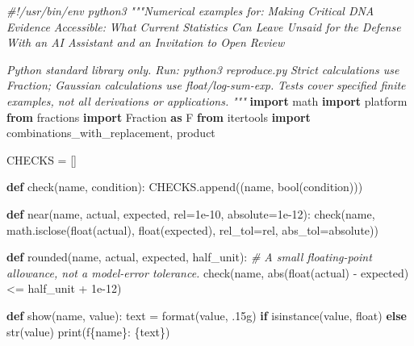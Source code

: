 \documentclass[
]{article}
\newenvironment{Shaded}{}{}
\newcommand{\BuiltInTok}[1]{\textcolor[rgb]{0.00,0.50,0.00}{#1}}
\newcommand{\CommentTok}[1]{\textcolor[rgb]{0.38,0.63,0.69}{\textit{#1}}}
\newcommand{\ControlFlowTok}[1]{\textcolor[rgb]{0.00,0.44,0.13}{\textbf{#1}}}
\newcommand{\FloatTok}[1]{\textcolor[rgb]{0.25,0.63,0.44}{#1}}
\newcommand{\ImportTok}[1]{\textcolor[rgb]{0.00,0.50,0.00}{\textbf{#1}}}
\newcommand{\KeywordTok}[1]{\textcolor[rgb]{0.00,0.44,0.13}{\textbf{#1}}}
\newcommand{\NormalTok}[1]{#1}
\newcommand{\OperatorTok}[1]{\textcolor[rgb]{0.40,0.40,0.40}{#1}}
\newcommand{\SpecialCharTok}[1]{\textcolor[rgb]{0.25,0.44,0.63}{#1}}
\newcommand{\SpecialStringTok}[1]{\textcolor[rgb]{0.73,0.40,0.53}{#1}}
\newcommand{\StringTok}[1]{\textcolor[rgb]{0.25,0.44,0.63}{#1}}
\begin{document}
\begin{Shaded}
\begin{Highlighting}[]
\CommentTok{\#!/usr/bin/env python3}
\CommentTok{"""Numerical examples for:}
\CommentTok{Making Critical DNA Evidence Accessible:}
\CommentTok{What Current Statistics Can Leave Unsaid for the Defense}
\CommentTok{With an AI Assistant and an Invitation to Open Review}

\CommentTok{Python standard library only. Run: python3 reproduce.py}
\CommentTok{Strict calculations use Fraction; Gaussian calculations use float/log{-}sum{-}exp.}
\CommentTok{Tests cover specified finite examples, not all derivations or applications.}
\CommentTok{"""}
\ImportTok{import}\NormalTok{ math}
\ImportTok{import}\NormalTok{ platform}
\ImportTok{from}\NormalTok{ fractions }\ImportTok{import}\NormalTok{ Fraction }\ImportTok{as}\NormalTok{ F}
\ImportTok{from}\NormalTok{ itertools }\ImportTok{import}\NormalTok{ combinations\_with\_replacement, product}

\NormalTok{CHECKS }\OperatorTok{=}\NormalTok{ []}


\KeywordTok{def}\NormalTok{ check(name, condition):}
\NormalTok{    CHECKS.append((name, }\BuiltInTok{bool}\NormalTok{(condition)))}


\KeywordTok{def}\NormalTok{ near(name, actual, expected, rel}\OperatorTok{=}\FloatTok{1e{-}10}\NormalTok{, absolute}\OperatorTok{=}\FloatTok{1e{-}12}\NormalTok{):}
\NormalTok{    check(name, math.isclose(}\BuiltInTok{float}\NormalTok{(actual), }\BuiltInTok{float}\NormalTok{(expected),}
\NormalTok{                            rel\_tol}\OperatorTok{=}\NormalTok{rel, abs\_tol}\OperatorTok{=}\NormalTok{absolute))}


\KeywordTok{def}\NormalTok{ rounded(name, actual, expected, half\_unit):}
    \CommentTok{\# A small floating{-}point allowance, not a model{-}error tolerance.}
\NormalTok{    check(name, }\BuiltInTok{abs}\NormalTok{(}\BuiltInTok{float}\NormalTok{(actual) }\OperatorTok{{-}}\NormalTok{ expected) }\OperatorTok{\textless{}=}\NormalTok{ half\_unit }\OperatorTok{+} \FloatTok{1e{-}12}\NormalTok{)}


\KeywordTok{def}\NormalTok{ show(name, value):}
\NormalTok{    text }\OperatorTok{=} \BuiltInTok{format}\NormalTok{(value, }\StringTok{\textquotesingle{}.15g\textquotesingle{}}\NormalTok{) }\ControlFlowTok{if} \BuiltInTok{isinstance}\NormalTok{(value, }\BuiltInTok{float}\NormalTok{) }\ControlFlowTok{else} \BuiltInTok{str}\NormalTok{(value)}
    \BuiltInTok{print}\NormalTok{(}\SpecialStringTok{f\textquotesingle{}}\SpecialCharTok{\{}\NormalTok{name}\SpecialCharTok{\}}\SpecialStringTok{: }\SpecialCharTok{\{}\NormalTok{text}\SpecialCharTok{\}}\SpecialStringTok{\textquotesingle{}}\NormalTok{)}



\end{Highlighting}
\end{Shaded}
\end{document}
